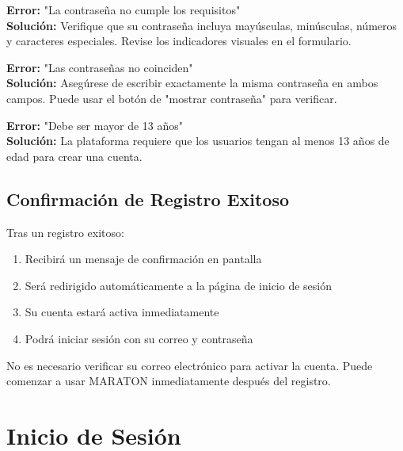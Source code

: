 \documentclass[11pt,a4paper,twoside]{book}
\begin{document}
\begin{errorbox}
\textbf{Error:} "La contraseña no cumple los requisitos"\\
\textbf{Solución:} Verifique que su contraseña incluya mayúsculas, minúsculas, números y caracteres especiales. Revise los indicadores visuales en el formulario.
\end{errorbox}

\begin{errorbox}
\textbf{Error:} "Las contraseñas no coinciden"\\
\textbf{Solución:} Asegúrese de escribir exactamente la misma contraseña en ambos campos. Puede usar el botón de "mostrar contraseña" para verificar.
\end{errorbox}

\begin{errorbox}
\textbf{Error:} "Debe ser mayor de 13 años"\\
\textbf{Solución:} La plataforma requiere que los usuarios tengan al menos 13 años de edad para crear una cuenta.
\end{errorbox}

\section{Confirmación de Registro Exitoso}

Tras un registro exitoso:

\begin{enumerate}
    \item Recibirá un mensaje de confirmación en pantalla
    \item Será redirigido automáticamente a la página de inicio de sesión
    \item Su cuenta estará activa inmediatamente
    \item Podrá iniciar sesión con su correo y contraseña
\end{enumerate}

\begin{notebox}
No es necesario verificar su correo electrónico para activar la cuenta. Puede comenzar a usar MARATON inmediatamente después del registro.
\end{notebox}

\chapter{Inicio de Sesión}
\end{document}
